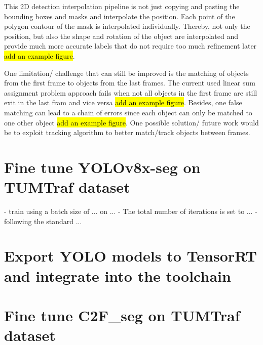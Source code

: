 This 2D detection interpolation pipeline is not just copying and pasting the bounding boxes and masks and interpolate the position. Each point of the polygon contour of the mask is interpolated individually. Thereby, not only the position, but also the shape and rotation of the object are interpolated and provide much more accurate labels that do not require too much refinement later \hl{add an example figure}. 

One limitation/ challenge that can still be improved is the matching of objects from the first frame to objects from the last frames. The current used linear sum assignment problem approach fails when not all objects in the first frame are still exit in the last fram and vice versa \hl{add an example figure}. Besides, one false matching can lead to a chain of errors since each object can only be matched to one other object \hl{add an example figure}. One possible solution/ future work would be to exploit tracking algorithm to better match/track objects between frames. 


\section{Fine tune YOLOv8x-seg on TUMTraf dataset}
- train using a batch size of ... on ... 
- The total number of iterations is set to ...
- following the standard ...

\section{Export YOLO models to TensorRT and integrate into the toolchain}

\section{Fine tune C2F\_seg on TUMTraf dataset}



